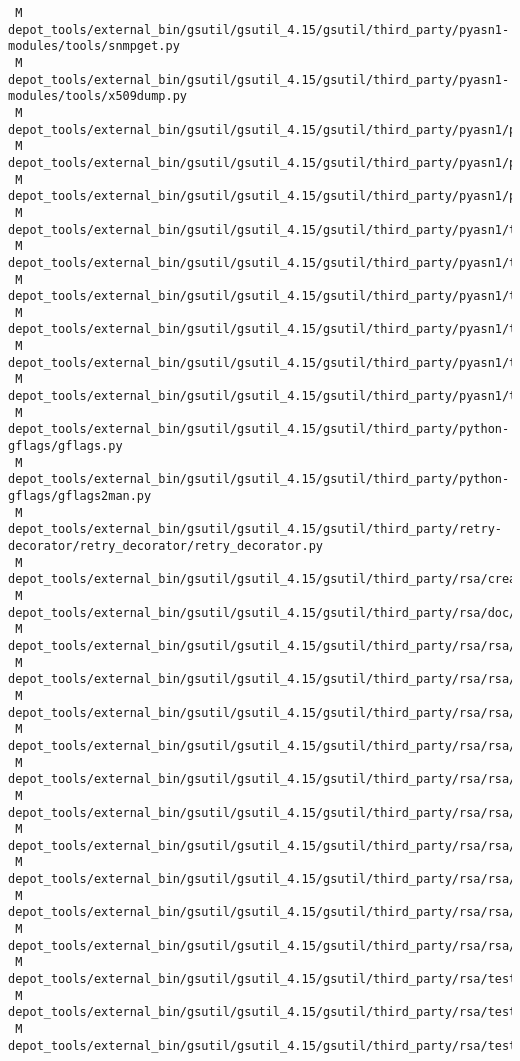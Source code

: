 \documentclass{article}
\begin{document}
\begin{verbatim}
 M depot_tools/external_bin/gsutil/gsutil_4.15/gsutil/third_party/pyasn1-modules/tools/snmpget.py
 M depot_tools/external_bin/gsutil/gsutil_4.15/gsutil/third_party/pyasn1-modules/tools/x509dump.py
 M depot_tools/external_bin/gsutil/gsutil_4.15/gsutil/third_party/pyasn1/pyasn1/codec/ber/decoder.py
 M depot_tools/external_bin/gsutil/gsutil_4.15/gsutil/third_party/pyasn1/pyasn1/debug.py
 M depot_tools/external_bin/gsutil/gsutil_4.15/gsutil/third_party/pyasn1/pyasn1/type/univ.py
 M depot_tools/external_bin/gsutil/gsutil_4.15/gsutil/third_party/pyasn1/test/codec/ber/suite.py
 M depot_tools/external_bin/gsutil/gsutil_4.15/gsutil/third_party/pyasn1/test/codec/cer/suite.py
 M depot_tools/external_bin/gsutil/gsutil_4.15/gsutil/third_party/pyasn1/test/codec/der/suite.py
 M depot_tools/external_bin/gsutil/gsutil_4.15/gsutil/third_party/pyasn1/test/codec/suite.py
 M depot_tools/external_bin/gsutil/gsutil_4.15/gsutil/third_party/pyasn1/test/suite.py
 M depot_tools/external_bin/gsutil/gsutil_4.15/gsutil/third_party/pyasn1/test/type/suite.py
 M depot_tools/external_bin/gsutil/gsutil_4.15/gsutil/third_party/python-gflags/gflags.py
 M depot_tools/external_bin/gsutil/gsutil_4.15/gsutil/third_party/python-gflags/gflags2man.py
 M depot_tools/external_bin/gsutil/gsutil_4.15/gsutil/third_party/retry-decorator/retry_decorator/retry_decorator.py
 M depot_tools/external_bin/gsutil/gsutil_4.15/gsutil/third_party/rsa/create_timing_table.py
 M depot_tools/external_bin/gsutil/gsutil_4.15/gsutil/third_party/rsa/doc/conf.py
 M depot_tools/external_bin/gsutil/gsutil_4.15/gsutil/third_party/rsa/rsa/_compat.py
 M depot_tools/external_bin/gsutil/gsutil_4.15/gsutil/third_party/rsa/rsa/_version133.py
 M depot_tools/external_bin/gsutil/gsutil_4.15/gsutil/third_party/rsa/rsa/_version200.py
 M depot_tools/external_bin/gsutil/gsutil_4.15/gsutil/third_party/rsa/rsa/cli.py
 M depot_tools/external_bin/gsutil/gsutil_4.15/gsutil/third_party/rsa/rsa/key.py
 M depot_tools/external_bin/gsutil/gsutil_4.15/gsutil/third_party/rsa/rsa/parallel.py
 M depot_tools/external_bin/gsutil/gsutil_4.15/gsutil/third_party/rsa/rsa/pkcs1.py
 M depot_tools/external_bin/gsutil/gsutil_4.15/gsutil/third_party/rsa/rsa/prime.py
 M depot_tools/external_bin/gsutil/gsutil_4.15/gsutil/third_party/rsa/rsa/transform.py
 M depot_tools/external_bin/gsutil/gsutil_4.15/gsutil/third_party/rsa/rsa/util.py
 M depot_tools/external_bin/gsutil/gsutil_4.15/gsutil/third_party/rsa/tests/constants.py
 M depot_tools/external_bin/gsutil/gsutil_4.15/gsutil/third_party/rsa/tests/py2kconstants.py
 M depot_tools/external_bin/gsutil/gsutil_4.15/gsutil/third_party/rsa/tests/py3kconstants.py

\end{verbatim}
\end{document}
